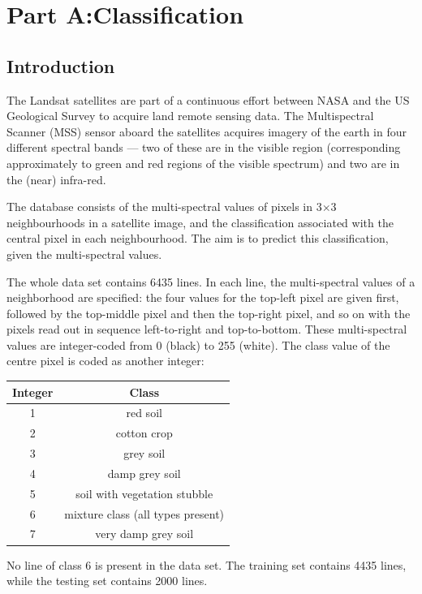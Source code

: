 \chapter*{Part A:\@ Classification}

\section*{Introduction}

The Landsat satellites are part of a continuous effort between NASA and
the US Geological Survey to acquire land remote sensing data. The
Multispectral Scanner (MSS) sensor aboard the satellites acquires imagery
of the earth in four different spectral bands --- two of these are in the
visible region (corresponding approximately to green and red regions of
the visible spectrum) and two are in the (near) infra-red.

The database consists of the multi-spectral values of pixels in 3\(\times \)3
neighbourhoods in a satellite image, and the classification associated with
the central pixel in each neighbourhood. The aim is to predict this
classification, given the multi-spectral values. 

The whole data set contains 6435 lines. In each line, the multi-spectral
values of a neighborhood are specified: the four values for the top-left
pixel are given first, followed by the top-middle pixel and then the
top-right pixel, and so on with the pixels read out in sequence
left-to-right and top-to-bottom. These multi-spectral values are
integer-coded from 0 (black) to 255 (white). The class value of the centre
pixel is coded as another integer:

\begin{center}
\begin{tabular}{cc}
    Integer & Class \\
    \midrule
    1 & red soil \\ 
    2 & cotton crop \\
    3 & grey soil \\
    4 & damp grey soil \\
    5 & soil with vegetation stubble \\
    6 & mixture class (all types present) \\
    7 & very damp grey soil \\
\end{tabular}
\end{center}

No line of class 6 is present in the data set. The training set contains
4435 lines, while the testing set contains 2000 lines.


